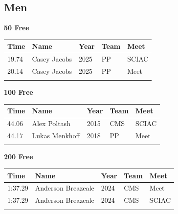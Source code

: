 \subsection{Men}
\vspace{1.2em}
\noindent\begin{minipage}[t]{0.98\textwidth}
\centering
\textbf{\textcolor{teamprimary}{50 Free}}\par
\vspace{0.5em}
\centering
\small
\renewcommand{\arraystretch}{1.0}
\setlength{\tabcolsep}{4pt}
\begin{tabular}{@{}p{2.5cm}p{4.5cm}p{1.5cm}p{2.5cm}p{2.5cm}@{}}
\toprule
\textbf{Time} & \textbf{Name} & \textbf{Year} & \textbf{Team} & \textbf{Meet} \\
\midrule
19.74 & Casey Jacobs & 2025 & PP & SCIAC \\
20.14 & Casey Jacobs & 2025 & PP & Meet \\
\bottomrule
\vspace{0.5em}
\end{tabular}
\end{minipage}
\vspace{1.2em}
\noindent\begin{minipage}[t]{0.98\textwidth}
\centering
\textbf{\textcolor{teamprimary}{100 Free}}\par
\vspace{0.5em}
\centering
\small
\renewcommand{\arraystretch}{1.0}
\setlength{\tabcolsep}{4pt}
\begin{tabular}{@{}p{2.5cm}p{4.5cm}p{1.5cm}p{2.5cm}p{2.5cm}@{}}
\toprule
\textbf{Time} & \textbf{Name} & \textbf{Year} & \textbf{Team} & \textbf{Meet} \\
\midrule
44.06 & Alex Poltash & 2015 & CMS & SCIAC \\
44.17 & Lukas Menkhoff & 2018 & PP & Meet \\
\bottomrule
\vspace{0.5em}
\end{tabular}
\end{minipage}
\vspace{1.2em}
\noindent\begin{minipage}[t]{0.98\textwidth}
\centering
\textbf{\textcolor{teamprimary}{200 Free}}\par
\vspace{0.5em}
\centering
\small
\renewcommand{\arraystretch}{1.0}
\setlength{\tabcolsep}{4pt}
\begin{tabular}{@{}p{2.5cm}p{4.5cm}p{1.5cm}p{2.5cm}p{2.5cm}@{}}
\toprule
\textbf{Time} & \textbf{Name} & \textbf{Year} & \textbf{Team} & \textbf{Meet} \\
\midrule
1:37.29 & Anderson Breazeale & 2024 & CMS & Meet \\
1:37.29 & Anderson Breazeale & 2024 & CMS & SCIAC \\
\bottomrule
\vspace{0.5em}
\end{tabular}
\end{minipage}

